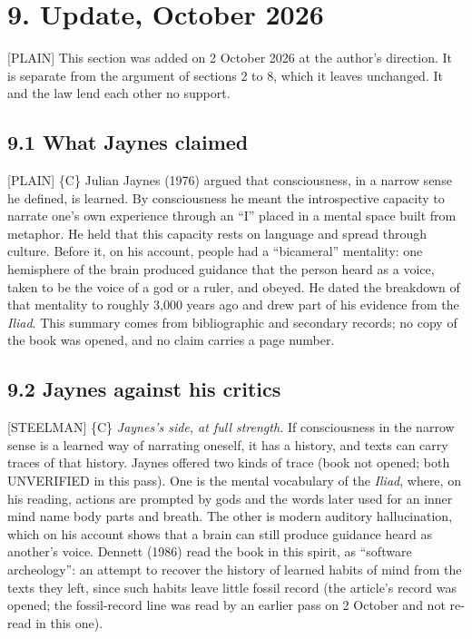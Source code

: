 \documentclass[11pt]{article}
\newcommand{\register}[1]{{\ttfamily\small #1}}
\begin{document}
\section*{9. Update, October 2026}

\register{[PLAIN]} This section was added on 2 October 2026 at the author's direction. It is separate from the argument of sections 2 to 8, which it leaves unchanged. It and the law lend each other no support.

\subsection*{9.1 What Jaynes claimed}

\register{[PLAIN]} \{C\} Julian Jaynes (1976) argued that consciousness, in a narrow sense he defined, is learned. By consciousness he meant the introspective capacity to narrate one's own experience through an ``I'' placed in a mental space built from metaphor. He held that this capacity rests on language and spread through culture. Before it, on his account, people had a ``bicameral'' mentality: one hemisphere of the brain produced guidance that the person heard as a voice, taken to be the voice of a god or a ruler, and obeyed. He dated the breakdown of that mentality to roughly 3,000 years ago and drew part of his evidence from the \emph{Iliad}. This summary comes from bibliographic and secondary records; no copy of the book was opened, and no claim carries a page number.

\subsection*{9.2 Jaynes against his critics}

\register{[STEELMAN]} \{C\} \emph{Jaynes's side, at full strength.} If consciousness in the narrow sense is a learned way of narrating oneself, it has a history, and texts can carry traces of that history. Jaynes offered two kinds of trace (book not opened; both UNVERIFIED in this pass). One is the mental vocabulary of the \emph{Iliad}, where, on his reading, actions are prompted by gods and the words later used for an inner mind name body parts and breath. The other is modern auditory hallucination, which on his account shows that a brain can still produce guidance heard as another's voice. Dennett (1986) read the book in this spirit, as ``software archeology'': an attempt to recover the history of learned habits of mind from the texts they left, since such habits leave little fossil record (the article's record was opened; the fossil-record line was read by an earlier pass on 2 October and not re-read in this one).
\end{document}
